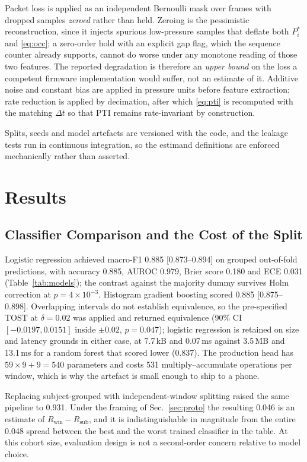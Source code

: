 \documentclass[10pt,conference,a4paper]{IEEEtran}
\begin{document}
Packet loss is applied as an independent Bernoulli mask over frames with
dropped samples \emph{zeroed} rather than held. Zeroing is the pessimistic
reconstruction, since it injects spurious low-pressure samples that deflate
both $P^{\ast}_i$ and \eqref{eq:occ}; a zero-order hold with an explicit gap
flag, which the sequence counter already supports, cannot do worse under any
monotone reading of those two features. The reported degradation is therefore
an \emph{upper bound} on the loss a competent firmware implementation would
suffer, not an estimate of it. Additive noise and constant bias are applied in
pressure units before feature extraction; rate reduction is applied by
decimation, after which \eqref{eq:pti} is recomputed with the matching
$\Delta t$ so that PTI remains rate-invariant by construction.

Splits, seeds and model artefacts are versioned with the code, and the leakage
tests run in continuous integration, so the estimand definitions are enforced
mechanically rather than asserted.

\section{Results}

\subsection{Classifier Comparison and the Cost of the Split}
\label{sec:models}

Logistic regression achieved macro-F1 0.885 [0.873--0.894] on grouped
out-of-fold predictions, with accuracy 0.885, AUROC 0.979, Brier score 0.180
and ECE 0.031 (Table~\ref{tab:models}); the contrast against the majority dummy
survives Holm correction at $p=4\times10^{-3}$. Histogram gradient boosting
scored 0.885 [0.875--0.898]. Overlapping intervals do not establish
equivalence, so the pre-specified TOST at $\delta=0.02$ was applied and
returned equivalence (90\% CI $[-0.0197,0.0151]$ inside $\pm0.02$, $p=0.047$); logistic regression is retained on size and
latency grounds in either case, at 7.7\,kB and 0.07\,ms against 3.5\,MB and
13.1\,ms for a random forest that scored lower (0.837). The production head has
$59\times9+9=540$ parameters and costs 531 multiply--accumulate operations per
window, which is why the artefact is small enough to ship to a phone.

Replacing subject-grouped with independent-window splitting raised the same
pipeline to 0.931. Under the framing of Sec.~\ref{sec:proto} the resulting
0.046 is an estimate of $R_{\mathrm{win}}-R_{\mathrm{sub}}$, and it is
indistinguishable in magnitude from the entire 0.048 spread between the best
and the worst trained classifier in the table. At this cohort size, evaluation
design is not a second-order concern relative to model choice.
\end{document}

